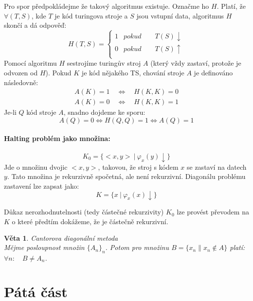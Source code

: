 \documentclass[a4paper]{article}      %
\newtheorem{theorem}{Věta}[section]
\newenvironment{proof}[1][Důkaz]{\begin{trivlist}
\item[\hskip \labelsep {\bfseries #1}]}{\end{trivlist}}
\begin{document}
\begin{proof}
Pro spor předpokládejme že takový algoritmus existuje. Označme ho $H$. Platí, že $\forall (T,S)$, kde $T$ je kód turingova stroje a $S$ jsou vstupní data, algoritmus $H$ skončí a dá odpověď:
\begin{equation}
H(T,S) =
\left\{
	\begin{array}{ll}
	1 & pokud\qquad T(S)\downarrow\\
	0 & pokud\qquad T(S)\uparrow\\
	\end{array}
\right.
\end{equation}
Pomocí algoritmu $H$ sestrojíme turingův stroj $A$ (který vždy zastaví, protože je odvozen od $H$).
Pokud $K$ je kód nějakého TS, chování stroje $A$ je definováno následovně:
\begin{eqnarray}
A(K) = 1\quad \Leftrightarrow\quad H(K,K) = 0\\
A(K) = 0\quad \Leftrightarrow\quad H(K,K) = 1 
\end{eqnarray}
Je-li $Q$ kód stroje $A$, snadno dojdeme ke sporu:
\[
A(Q) = 0 \Leftrightarrow H(Q,Q) = 1 \Leftrightarrow A(Q) = 1
\] 
\end{proof}

\paragraph{Halting problém jako množina:}
\[
K_0 = \lbrace <x,y>\ |\ \varphi_{x}(y)\downarrow \rbrace
\]
Jde o množinu dvojic $<x,y>$, takovou, že stroj s kódem $x$ se zastaví na datech $y$. Tato množina je rekurzivně spočetná, ale není rekurzivní.
Diagonálu problému zastavení lze zapsat jako:
\[
K = \lbrace x\ |\ \varphi_{x}(x)\downarrow \rbrace 
\]

Důkaz nerozhodnutelnosti (tedy částečné rekurzivity) $K_0$ lze provést převodem na $K$ o které předtím dokážeme, že je částečně rekurzivní.

\begin{theorem} \emph{Cantorova diagonální metoda}\\
Mějme posloupnost množin $\lbrace A_n \rbrace_n$.
Potom pro množinu $B = \lbrace x_n \| x_n \notin A\rbrace$ platí: $\forall n:\quad B\neq A_n$.
\end{theorem}

\section{Pátá část}
\end{document}
